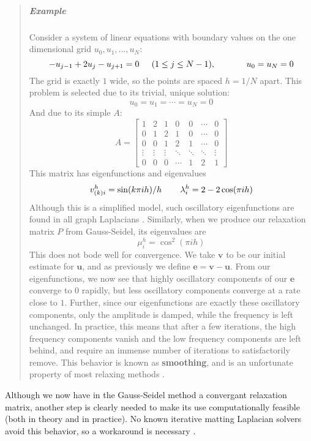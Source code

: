 \begin{quote}
\item
\subparagraph{Example}
Consider a system of linear equations with boundary values on the one dimensional grid $u_0,u_1,\ldots,u_N$:
\[-u_{j-1}+2u_j-u_{j+1}=0\hspace{.2in}(1\leq j\leq N-1),
\hspace{.5in}u_0=u_N=0\]
The grid is exactly $1$ wide, so the points are spaced $h=1/N$ apart.
This problem is selected due to its trivial, unique solution:
\[u_0=u_1=\cdots=u_N=0\]
And due to its simple $A$:
\[A=
\left[\begin{array}{ccccccc}
1 & 2 & 1 & 0 & 0 & \cdots & 0 \\
0 & 1 & 2 & 1 & 0 & \cdots & 0 \\
0 & 0 & 1 & 2 & 1 & \cdots & 0 \\
\vdots & \vdots & \vdots & \ddots & \ddots & \ddots & \vdots \\
0 & 0 & 0 & \cdots & 1 & 2 & 1
\end{array}\right]\]
This matrix has eigenfunctions and eigenvalues
\[v^h_{(k)i}=\sin(k\pi ih)/h\hspace{.3in}
\lambda_i^h=2-2\cos(\pi ih)\]
Although this is a simplified model, such oscillatory eigenfunctions are found in all graph Laplacians \cite{lee14}. Similarly, when we produce our relaxation matrix $P$ from Gauss-Seidel, its eigenvalues are
\[\mu_i^h=\cos^2(\pi i h)\]
This does not bode well for convergence. We take $\textbf{v}$ to be our initial estimate for $\textbf{u}$, and as previously we define $\textbf{e}=\textbf{v}-\textbf{u}$. From our eigenfunctions, we now see that highly oscillatory components of our $\textbf{e}$ converge to $0$ rapidly, but less oscillatory components converge at a rate close to $1$. Further, since our eigenfunctions are exactly these oscillatory components, only the amplitude is damped, while the frequency is left unchanged. In practice, this means that after a few iterations, the high frequency components vanish and the low frequency components are left behind, and require an immense number of iterations to satisfactorily remove. This behavior is known as \textbf{smoothing}, and is an unfortunate property of most relaxing methods \cite{briggs87}.
\end{quote}
Although we now have in the Gauss-Seidel method a convergant relaxation matrix, another step is clearly needed to make its use computationally feasible (both in theory and in practice). No known iterative matting Laplacian solvers avoid this behavior, so a workaround is necessary \cite{lee14}.